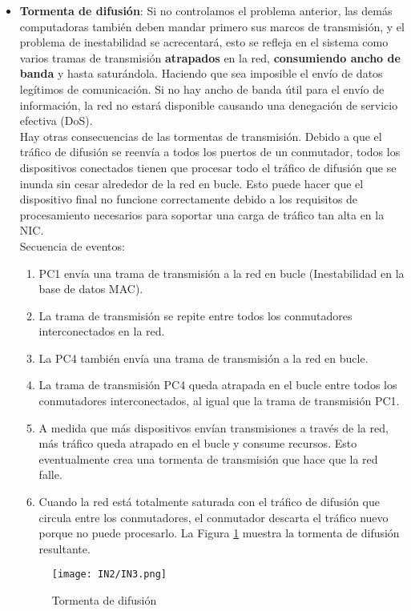 \documentclass[
	12pt, %
	fleqn, %
	a4paper, %
	oneside, %
]{LegrandOrangeBook}
\begin{document}
\begin{itemize}
\item \textbf{Tormenta de difusión}: Si no controlamos el problema anterior, las demás computadoras también deben mandar primero sus marcos de transmisión, y el problema de inestabilidad se acrecentará, esto se refleja en el sistema como varios tramas de transmisión \textbf{atrapados} en la red, \textbf{consumiendo ancho de banda} y hasta saturándola. Haciendo que sea imposible el envío de datos legítimos de comunicación. Si no hay ancho de banda útil para el envío de información, la red no estará disponible causando una denegación de servicio efectiva (DoS).\\
Hay otras consecuencias de las tormentas de transmisión. Debido a que el tráfico de difusión se reenvía a todos los puertos de un conmutador, todos los dispositivos conectados tienen que procesar todo el tráfico de difusión que se inunda sin cesar alrededor de la red en bucle. Esto puede hacer que el dispositivo final no funcione correctamente debido a los requisitos de procesamiento necesarios para soportar una carga de tráfico tan alta en la NIC.\\
Secuencia de eventos:
\begin{enumerate}
\item PC1 envía una trama de transmisión a la red en bucle (Inestabilidad en la base de datos MAC).
\item La trama de transmisión se repite entre todos los conmutadores interconectados en la red.
\item La PC4 también envía una trama de transmisión a la red en bucle.
\item La trama de transmisión PC4 queda atrapada en el bucle entre todos los conmutadores interconectados, al igual que la trama de transmisión PC1.
\item A medida que más dispositivos envían transmisiones a través de la red, más tráfico queda atrapado en el bucle y consume recursos. Esto eventualmente crea una tormenta de transmisión que hace que la red falle.
\item Cuando la red está totalmente saturada con el tráfico de difusión que circula entre los conmutadores, el conmutador descarta el tráfico nuevo porque no puede procesarlo. La Figura \ref{fig:tormenta de difusión} muestra la tormenta de difusión resultante.
\end{enumerate}
\begin{figure}[H]
\centering
\texttt{[image: IN2/IN3.png]}
\caption{Tormenta de difusión}
\label{fig:tormenta de difusión}
\end{figure}

\end{itemize}
\end{document}
